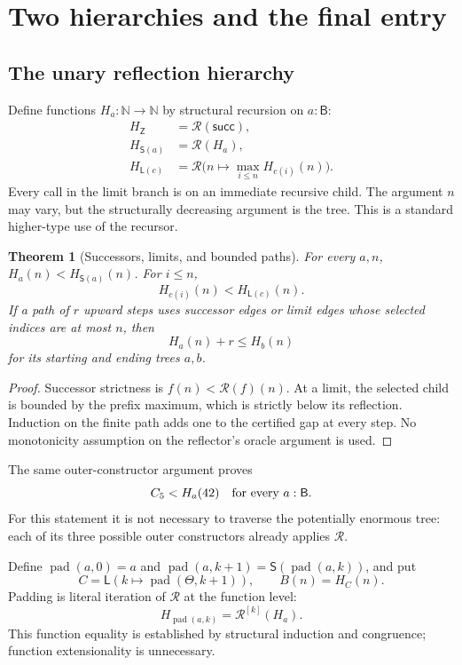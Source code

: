 \documentclass[11pt,a4paper]{article}
\newtheorem{theorem}{Theorem}[section]
\theoremstyle{definition}
\newcommand{\N}{\mathbb N}
\newcommand{\B}{\mathsf B}
\newcommand{\pad}{\operatorname{pad}}
\newcommand{\R}{\mathcal R}
\begin{document}
\section{Two hierarchies and the final entry}
\label{sec:entry}

\subsection{The unary reflection hierarchy}

Define functions \(H_a:\N\to\N\) by structural recursion on \(a:\B\):
\begin{align}
 H_{\mathsf Z}&=\R(\mathsf{succ}),\nonumber\\
 H_{\mathsf S(a)}&=\R(H_a),\label{eq:H}\\
 H_{\mathsf L(c)}&=
       \R\bigl(n\mapsto\max_{i\le n}H_{c(i)}(n)\bigr).\nonumber
\end{align}
Every call in the limit branch is on an immediate recursive child. The
argument \(n\) may vary, but the structurally decreasing argument is the
tree. This is a standard higher-type use of the recursor.

\begin{theorem}[Successors, limits, and bounded paths]
For every \(a,n\), \(H_a(n)<H_{\mathsf S(a)}(n)\). For \(i\le n\),
\[
                    H_{c(i)}(n)<H_{\mathsf L(c)}(n).
\]
If a path of \(r\) upward steps uses successor edges or limit edges whose
selected indices are at most \(n\), then
\[
                    H_a(n)+r\le H_b(n)
\]
for its starting and ending trees \(a,b\).
\end{theorem}
\begin{proof}
Successor strictness is \(f(n)<\R(f)(n)\). At a limit, the selected child is
bounded by the prefix maximum, which is strictly below its reflection.
Induction on the finite path adds one to the certified gap at every step.
No monotonicity assumption on the reflector's oracle argument is used.
\end{proof}

The same outer-constructor argument proves
\[
                         C_5<H_a(42)
                         \quad\hbox{for every }a:\B.
\]
For this statement it is not necessary to traverse the potentially enormous
tree: each of its three possible outer constructors already applies \(\R\).

Define \(\pad(a,0)=a\) and
\(\pad(a,k+1)=\mathsf S(\pad(a,k))\), and put
\begin{equation}
            C=\mathsf L(k\mapsto\pad(\Theta,k+1)),
            \qquad B(n)=H_C(n).
\label{eq:C}
\end{equation}
Padding is literal iteration of \(\R\) at the function level:
\[
             H_{\pad(a,k)}=\R^{[k]}(H_a).
\]
This function equality is established by structural induction and
congruence; function extensionality is unnecessary.
\end{document}
